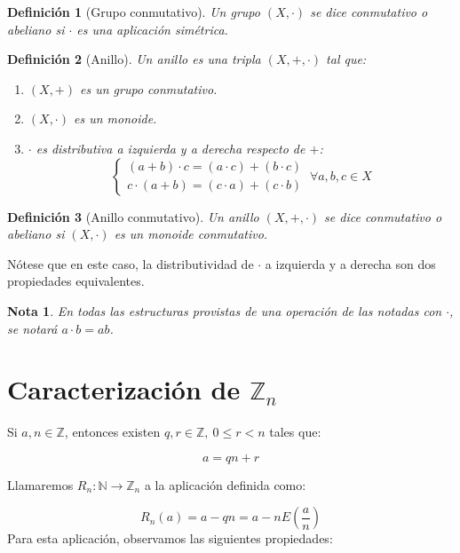 \documentclass[11pt, a4paper, titlepage]{article}
\newif\IfInSansMode
\theoremstyle{theorem-style}
\theoremstyle{definition-style}
\newtheorem{ndef}{Definición}[section]
\theoremstyle{remark-style}
\newtheorem*{nota}{Nota}
\theoremstyle{example-style}
\newenvironment{nlist}
{\begin{enumerate}
\renewcommand\labelenumi{(\emph{\roman{enumi})}}}
{\end{enumerate}}
\begin{document}
\begin{ndef}[Grupo conmutativo]
  Un grupo $(X, \cdot)$ se dice \emph{conmutativo} o \emph{abeliano} si $\cdot$ es una aplicación simétrica.
\end{ndef}


\begin{ndef}[Anillo]

  Un anillo es una tripla $(X, +, \cdot)$ tal que:

  \begin{nlist}
  \item $(X, +)$ es un grupo conmutativo.
  \item $(X, \cdot)$ es un monoide.
  \item $\cdot$ es distributiva a izquierda y a derecha respecto de $+$:
    \[
    \begin{cases}
      (a + b) \cdot c = (a \cdot c) + (b \cdot c)\\
      c \cdot (a + b) = (c \cdot a) + (c \cdot b)
    \end{cases} \ \forall a,b,c \in X
    \]

  \end{nlist}

\end{ndef}

\begin{ndef}[Anillo conmutativo]
  Un anillo $(X, +, \cdot)$ se dice \emph{conmutativo} o \emph{abeliano} si $(X, \cdot)$ es un monoide conmutativo.
\end{ndef}

Nótese que en este caso, la distributividad de $\cdot$ a izquierda y a derecha son dos propiedades equivalentes.

\begin{nota}
  En todas las estructuras provistas de una operación de las notadas con $\cdot$, se notará $a \cdot b = ab$.
\end{nota}


\section*{Caracterización de $\mathbb{Z}_{n}$}

Si $a,n\in \mathbb{Z}$, entonces existen $q,r \in \mathbb{Z},\ 0 \le r < n$ tales que:

\[
    a = qn + r
\]

Llamaremos $R_n:\mathbb{N} \rightarrow \mathbb{Z}_n$ a la aplicación definida como:

\[
R_n(a) = a - qn = a- nE\left(\frac{a}{n}\right)
\]
Para esta aplicación, observamos las siguientes propiedades:
\end{document}
